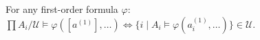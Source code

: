 For any first-order formula $\varphi$: $\prod A_i/\mathcal{U} \models \varphi([a^{(1)}],\ldots) \iff \{i \mid A_i \models \varphi(a^{(1)}_i,\ldots)\} \in \mathcal{U}$.
